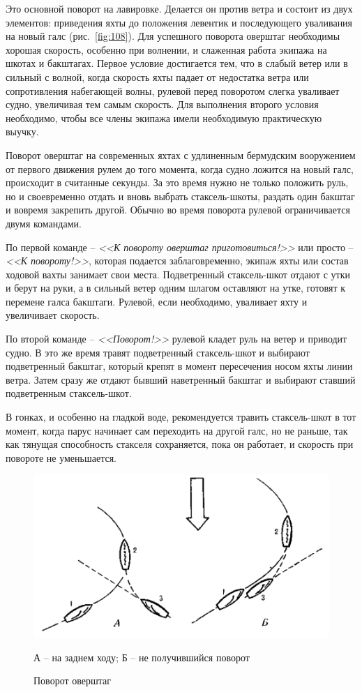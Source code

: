 \documentclass[a4paper, 12pt, twoside, final]{scrbook}
\begin{document}
Это основной поворот на лавировке. Делается он против ветра и состоит из двух элементов: приведения яхты до положения левентик и последующего уваливания на новый галс (рис.~\ref{fig:108}). Для успешного поворота оверштаг необходимы хорошая скорость, особенно при волнении, и слаженная работа экипажа на шкотах и бакштагах. Первое условие достигается тем, что в слабый ветер или в сильный с волной, когда скорость яхты падает от недостатка ветра или сопротивления набегающей волны, рулевой перед поворотом слегка уваливает судно, увеличивая тем самым скорость. Для выполнения второго условия необходимо, чтобы все члены экипажа имели необходимую практическую выучку.

Поворот оверштаг на современных яхтах с удлиненным бермудским вооружением от первого движения рулем до того момента, когда судно ложится на новый галс, происходит в считанные секунды. За это время нужно не только положить руль, но и своевременно отдать и вновь выбрать стаксель-шкоты, раздать один бакштаг и вовремя закрепить другой. Обычно во время поворота рулевой ограничивается двумя командами.

По первой команде \--- \textit{<<К повороту оверштаг приготовиться!>>} или просто \--- \textit{<<К повороту!>>}, которая подается заблаговременно, экипаж яхты или состав ходовой вахты занимает свои места. Подветренный стаксель-шкот отдают с утки и берут на руки, а в сильный ветер одним шлагом оставляют на утке, готовят к перемене галса бакштаги. Рулевой, если необходимо, уваливает яхту и увеличивает скорость.

По второй команде \--- \textit{<<Поворот!>>} рулевой кладет руль на ветер и приводит судно. В это же время травят подветренный стаксель-шкот и выбирают подветренный бакштаг, который крепят в момент пересечения носом яхты линии ветра. Затем сразу же отдают бывший наветренный бакштаг и выбирают ставший подветренным стаксель-шкот.

В гонках, и особенно на гладкой воде, рекомендуется травить стаксель-шкот в тот момент, когда парус начинает сам переходить на другой галс, но не раньше, так как тянущая способность стакселя сохраняется, пока он работает, и скорость при повороте не уменьшается.

\begin{figure}[htbp]
   \centering
   \includegraphics{109_Povorot_overshtag} %
   \caption{Поворот оверштаг}
   \label{fig:109}
   \centering\small
   А \--- на заднем ходу; Б \--- не получившийся поворот
\end{figure}
\end{document}

